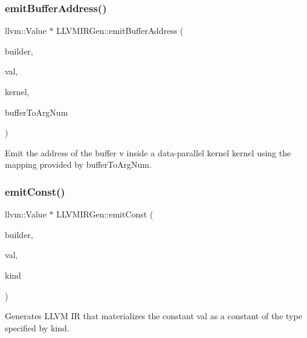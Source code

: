 \subsubsection{\texorpdfstring{emit\+Buffer\+Address()}{emitBufferAddress()}}
{\footnotesize\ttfamily llvm\+::\+Value $\ast$ L\+L\+V\+M\+I\+R\+Gen\+::emit\+Buffer\+Address (\begin{DoxyParamCaption}\item[{llvm\+::\+I\+R\+Builder$<$$>$ \&}]{builder,  }\item[{\hyperlink{classglow_1_1_value}{Value} $\ast$}]{val,  }\item[{llvm\+::\+Function $\ast$}]{kernel,  }\item[{llvm\+::\+Dense\+Map$<$ \hyperlink{classglow_1_1_value}{Value} $\ast$, int $>$ \&}]{buffer\+To\+Arg\+Num }\end{DoxyParamCaption})\hspace{0.3cm}{\ttfamily [protected]}}

Emit the address of the buffer {\ttfamily v} inside a data-\/parallel kernel {\ttfamily kernel} using the mapping provided by {\ttfamily buffer\+To\+Arg\+Num}. \mbox{\label{classglow_1_1_l_l_v_m_i_r_gen_a9058e2b14efacc79c28c71c74027e91b}} 
\subsubsection{\texorpdfstring{emit\+Const()}{emitConst()}}
{\footnotesize\ttfamily llvm\+::\+Value $\ast$ L\+L\+V\+M\+I\+R\+Gen\+::emit\+Const (\begin{DoxyParamCaption}\item[{llvm\+::\+I\+R\+Builder$<$$>$ \&}]{builder,  }\item[{float}]{val,  }\item[{\hyperlink{namespaceglow_ab92e14a94329daf4083db670e95fbcdf}{glow\+::\+Elem\+Kind}}]{kind }\end{DoxyParamCaption})\hspace{0.3cm}{\ttfamily [protected]}}

Generates L\+L\+VM IR that materializes the constant {\ttfamily val} as a constant of the type specified by {\ttfamily kind}. \mbox{\label{classglow_1_1_l_l_v_m_i_r_gen_ab48cd5bfd5d480f9f3d29b399132b8a5}} 
